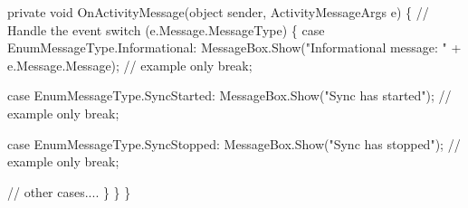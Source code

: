 \begin{DoxyCode}
          \textcolor{keyword}{private} \textcolor{keywordtype}{void} OnActivityMessage(\textcolor{keywordtype}{object} sender, ActivityMessageArgs e)
          \{
              \textcolor{comment}{// Handle the event}
              \textcolor{keywordflow}{switch} (e.Message.MessageType)
              \{
                  \textcolor{keywordflow}{case} EnumMessageType.Informational:
                      MessageBox.Show(\textcolor{stringliteral}{"Informational message: "} + e.Message.Message);  \textcolor{comment}{// example only}
                      \textcolor{keywordflow}{break};

                  \textcolor{keywordflow}{case} EnumMessageType.SyncStarted:
                      MessageBox.Show(\textcolor{stringliteral}{"Sync has started"});    \textcolor{comment}{// example only}
                      \textcolor{keywordflow}{break};

                  \textcolor{keywordflow}{case} EnumMessageType.SyncStopped:
                      MessageBox.Show(\textcolor{stringliteral}{"Sync has stopped"});    \textcolor{comment}{// example only}
                      \textcolor{keywordflow}{break};

                  \textcolor{comment}{// other cases....}
              \}
          \}
      \}
\end{DoxyCode}
 